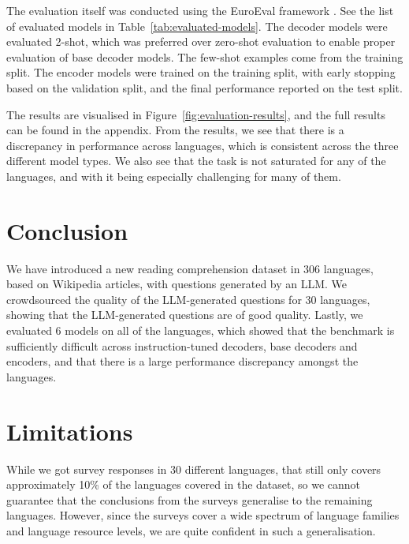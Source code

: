 \documentclass[10pt, a4paper]{article}
\begin{document}
The evaluation itself was conducted using the EuroEval framework
\cite{nielsen-2023-scandeval,saattrup-nielsen-etal-2025-encoder}. See the list of
evaluated models in Table~\ref{tab:evaluated-models}. The decoder models were evaluated
2-shot, which was preferred over zero-shot evaluation to enable proper evaluation of
base decoder models. The few-shot examples come from the training split. The encoder
models were trained on the training split, with early stopping based on the validation
split, and the final performance reported on the test split.

The results are visualised in Figure~\ref{fig:evaluation-results}, and the full results
can be found in the appendix. From the results, we see that there is a discrepancy in
performance across languages, which is consistent across the three different model
types. We also see that the task is not saturated for any of the languages, and with it
being especially challenging for many of them.


\section{Conclusion}
\label{sec:conclusion}

We have introduced a new reading comprehension dataset in 306 languages, based on
Wikipedia articles, with questions generated by an LLM. We crowdsourced the quality of
the LLM-generated questions for 30 languages, showing that the LLM-generated questions
are of good quality. Lastly, we evaluated 6 models on all of the languages, which showed
that the benchmark is sufficiently difficult across instruction-tuned decoders, base
decoders and encoders, and that there is a large performance discrepancy amongst the
languages.


\section*{Limitations}
\label{sec:limitations}

While we got survey responses in 30 different languages, that still only covers
approximately 10\% of the languages covered in the dataset, so we cannot guarantee that
the conclusions from the surveys generalise to the remaining languages. However, since
the surveys cover a wide spectrum of language families and language resource levels, we
are quite confident in such a generalisation.


\end{document}
